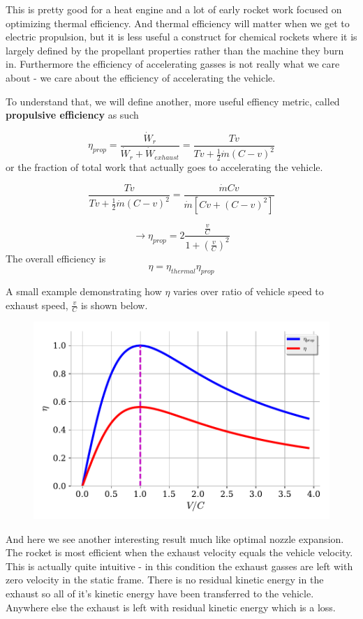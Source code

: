 \documentclass[twocolumn]{memoir} %
\begin{document}
This is pretty good for a heat engine and a lot of early rocket work focused on optimizing thermal efficiency.  And thermal efficiency will matter when we get to electric propulsion, but it is less useful a construct for chemical rockets where it is largely defined by the propellant properties rather than the machine they burn in.  Furthermore the efficiency of
accelerating gasses is not really what we care about - we care about the
efficiency of accelerating the vehicle.

To understand that, we will define another, more useful effiency metric, called
\textbf{propulsive efficiency} as such

\[\eta_{prop} = \frac{\dot{W}_{r}}{\dot{W}_{r} + \dot{W}_{exhaust}} = \frac{Tv}{Tv + \frac{1}{2}\dot{m}(C - v)^2}\]
%
or the fraction of total work that actually goes to accelerating the
vehicle.

\[\frac{Tv}{Tv + \frac{1}{2}\dot{m}(C - v)^2} = \frac{\dot{m}C v}{\dot{m}\left[C v + (C-v)^2\right]}\]

\[\rightarrow \eta_{prop} = 2\frac{\frac{v}{C}}{1+(\frac{v}{C})^2}\]
%
The overall efficiency is \[\eta = \eta_{thermal}\eta_{prop}\]

A small example demonstrating how \(\eta\) varies over ratio of vehicle
speed to exhaust speed, \(\frac{v}{C}\) is shown below.

\begin{figure}[H]
    \includegraphics[width=0.9\columnwidth]{prop_eff}
\end{figure}

And here we see another interesting result much like optimal nozzle
expansion. The rocket is most efficient when the exhaust velocity equals
the vehicle velocity. This is actually quite intuitive - in this
condition the exhaust gasses are left with zero velocity in the static
frame. There is no residual kinetic energy in the exhaust so all of it's
kinetic energy have been transferred to the vehicle. Anywhere else the
exhaust is left with residual kinetic energy which is a loss.
\end{document}
